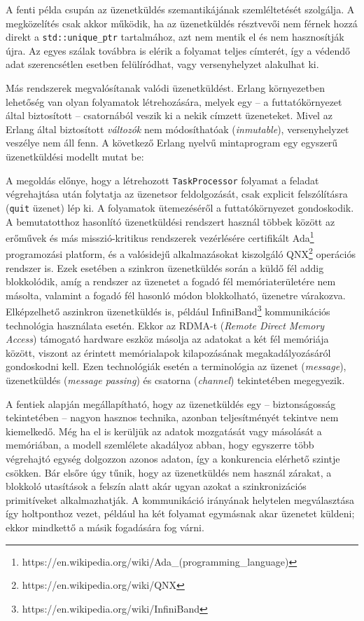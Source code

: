     A fenti példa csupán az üzenetküldés szemantikájának szemléltetését szolgálja. A megközelítés csak akkor működik, ha az üzenetküldés résztvevői nem férnek hozzá direkt a \texttt{std::unique\_ptr} tartalmához, azt nem mentik el és nem hasznosítják újra. Az egyes szálak továbbra is elérik a folyamat teljes címterét, így a védendő adat szerencsétlen esetben felülíródhat, vagy versenyhelyzet alakulhat ki.
    
    Más rendszerek megvalósítanak valódi üzenetküldést. Erlang környezetben lehetőség van olyan folyamatok létrehozására, melyek egy -- a futtatókörnyezet által biztosított -- csatornából veszik ki a nekik címzett üzeneteket. Mivel az Erlang által biztosított \emph{változók} nem módosíthatóak (\emph{inmutable}), versenyhelyzet veszélye nem áll fenn. A következő Erlang nyelvű mintaprogram egy egyszerű üzenetküldési modellt mutat be:
    
    \medskip    
    \lstset{
        basicstyle=\footnotesize\ttfamily
    }    
        
    \medskip
    
    A megoldás előnye, hogy a létrehozott \texttt{TaskProcessor} folyamat a feladat végrehajtása után folytatja az üzenetsor feldolgozását, csak explicit felszólításra (\texttt{quit} üzenet) lép ki. A folyamatok ütemezéséről a futtatókörnyezet gondoskodik. A bemutatotthoz hasonlító üzenetküldési rendszert használ többek között az erőművek és más misszió-kritikus rendszerek vezérlésére certifikált Ada\footnote{https://en.wikipedia.org/wiki/Ada\_(programming\_language)} programozási platform, és a valósidejű alkalmazásokat kiszolgáló QNX\footnote{https://en.wikipedia.org/wiki/QNX} operációs rendszer is. Ezek esetében a szinkron üzenetküldés során a küldő fél addig blokkolódik, amíg a rendszer az üzenetet a fogadó fél memóriaterületére nem másolta, valamint a fogadó fél hasonló módon blokkolható, üzenetre várakozva. Elképzelhető aszinkron üzenetküldés is, például InfiniBand\footnote{https://en.wikipedia.org/wiki/InfiniBand} kommunikációs technológia használata esetén. Ekkor az RDMA-t (\emph{Remote Direct Memory Access}) támogató hardware eszköz másolja az adatokat a két fél memóriája között, viszont az érintett memórialapok kilapozásának megakadályozásáról gondoskodni kell. Ezen technológiák esetén a terminológia az üzenet (\emph{message}), üzenetküldés (\emph{message passing}) és csatorna (\emph{channel}) tekintetében megegyezik.
    
    A fentiek alapján megállapítható, hogy az üzenetküldés egy -- biztonságosság tekintetében -- nagyon hasznos technika, azonban teljesítményét tekintve nem kiemelkedő. Még ha el is kerüljük az adatok mozgatását vagy másolását a memóriában, a modell szemlélete akadályoz abban, hogy egyszerre több végrehajtó egység dolgozzon azonos adaton, így a konkurencia elérhető szintje csökken. Bár elsőre úgy tűnik, hogy az üzenetküldés nem használ zárakat, a blokkoló utasítások a felszín alatt akár ugyan azokat a szinkronizációs primitíveket alkalmazhatják. A kommunikáció irányának helytelen megválasztása így holtponthoz vezet, például ha két folyamat egymásnak akar üzenetet küldeni; ekkor mindkettő a másik fogadására fog várni.
    
